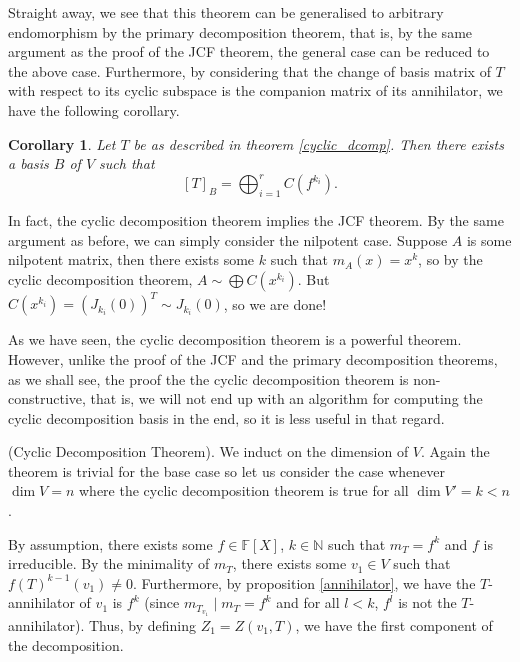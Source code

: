 \documentclass[
]{article}
\newtheorem{corollary}{Corollary}[theorem]
\theoremstyle{definition}
\begin{document}
Straight away, we see that this theorem can be generalised to arbitrary
endomorphism by the primary decomposition theorem, that is, by the same
argument as the proof of the JCF theorem, the general case can be
reduced to the above case. Furthermore, by considering that the change
of basis matrix of \(T\) with respect to its cyclic subspace is the
companion matrix of its annihilator, we have the following corollary.

\begin{corollary}
  Let \(T\) be as described in theorem \ref{cyclic_dcomp}. Then there exists a 
  basis \(B\) of \(V\) such that 
  \[[T]_B = \bigoplus_{i = 1}^r C(f^{k_i}).\]
\end{corollary}

In fact, the cyclic decomposition theorem implies the JCF theorem. By
the same argument as before, we can simply consider the nilpotent case.
Suppose \(A\) is some nilpotent matrix, then there exists some \(k\)
such that \(m_A(x) = x^k\), so by the cyclic decomposition theorem,
\(A \sim \bigoplus C(x^{k_i})\). But
\(C(x^{k_i}) = (J_{k_i}(0))^T \sim J_{k_i}(0)\), so we are done!

As we have seen, the cyclic decomposition theorem is a powerful theorem.
However, unlike the proof of the JCF and the primary decomposition
theorems, as we shall see, the proof the the cyclic decomposition
theorem is non-constructive, that is, we will not end up with an
algorithm for computing the cyclic decomposition basis in the end, so it
is less useful in that regard.

\proof (Cyclic Decomposition Theorem). We induct on the dimension of
\(V\). Again the theorem is trivial for the base case so let us consider
the case whenever \(\dim V = n\) where the cyclic decomposition theorem
is true for all \(\dim V' = k < n\).

By assumption, there exists some \(f \in \mathbb{F}[X]\),
\(k \in \mathbb{N}\) such that \(m_T = f^k\) and \(f\) is irreducible.
By the minimality of \(m_T\), there exists some \(v_1 \in V\) such that
\(f(T)^{k - 1}(v_1) \neq 0\). Furthermore, by proposition
\ref{annihilator}, we have the \(T\)-annihilator of \(v_1\) is \(f^k\)
(since \(m_{T_{v_1}} \mid m_T = f^k\) and for all \(l < k\), \(f^l\) is
not the \(T\)-annihilator). Thus, by defining \(Z_1 = Z(v_1, T)\), we
have the first component of the decomposition.
\end{document}
